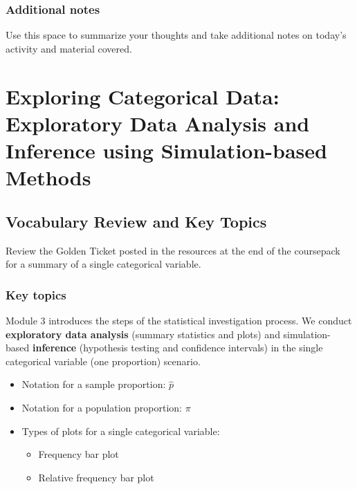 \documentclass[
]{report}
\begin{document}
\subsection{Additional notes}\label{additional-notes-2}

Use this space to summarize your thoughts and take additional notes on today's activity and material covered.

\newpage

\chapter{Exploring Categorical Data: Exploratory Data Analysis and Inference using Simulation-based Methods}\label{exploring-categorical-data-exploratory-data-analysis-and-inference-using-simulation-based-methods}

\section{Vocabulary Review and Key Topics}\label{vocabulary-review-and-key-topics-2}

Review the Golden Ticket posted in the resources at the end of the coursepack for a summary of a single categorical variable.

\subsection{Key topics}\label{key-topics-2}

Module 3 introduces the steps of the statistical investigation process. We conduct \textbf{exploratory data analysis} (summary statistics and plots) and simulation-based \textbf{inference} (hypothesis testing and confidence intervals) in the single categorical variable (one proportion) scenario.

\begin{itemize}
\item
  Notation for a sample proportion: \(\hat{p}\)
\item
  Notation for a population proportion: \(\pi\)
\item
  Types of plots for a single categorical variable:

  \begin{itemize}
  \item
    Frequency bar plot
  \item
    Relative frequency bar plot
  \end{itemize}
\end{itemize}
\end{document}

